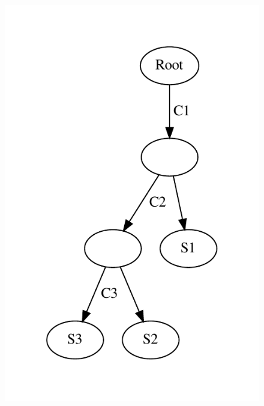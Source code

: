 \documentclass[a4paper,12pt, oneside]{book}
\begin{document}
\begin{esempio}
\begin{figure}[H]
    \includegraphics[scale = 0.5]{img/s2.pdf}
  \end{figure}
\end{esempio}
\end{document}
